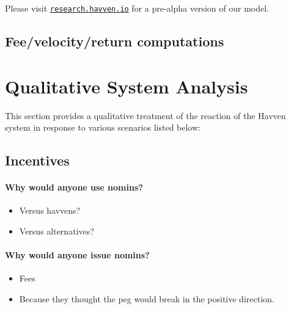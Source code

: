 


\noindent Please visit \href{http://research.havven.io}{\texttt{research.havven.io}} for a pre-alpha version of our model.

\subsection{Fee/velocity/return computations}

\pagebreak

\section{Qualitative System Analysis}

This section provides a qualitative treatment of the reaction of the Havven system in response to various scenarios listed below:


\subsection{Incentives}

\paragraph{Why would anyone use nomins?}
\begin{itemize}
	\item Versus havvens?
	\item Versus alternatives?
\end{itemize}

\paragraph{Why would anyone issue nomins?}
\begin{itemize}
	\item Fees
	\item Because they thought the peg would break in the positive direction.
\end{itemize}

